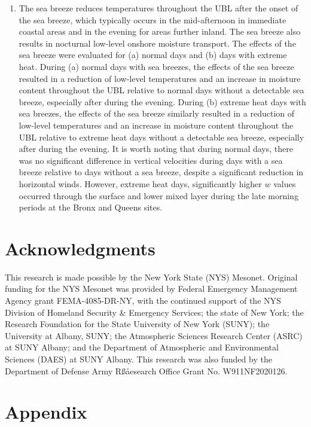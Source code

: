 \documentclass[11pt,a4paper]{article}
\begin{document}
\begin{enumerate}
	\item The sea breeze reduces temperatures throughout the UBL after the onset of the sea breeze, which typically occurs in the mid-afternoon in immediate coastal areas and in the evening for areas further inland. The sea breeze also results in nocturnal low-level onshore moisture transport. The effects of the sea breeze were evaluated for (a) normal days and (b) days with extreme heat. During (a) normal days with sea breezes, the effects of the sea breeze resulted in a reduction of low-level temperatures and an increase in moisture content throughout the UBL relative to normal days without a detectable sea breeze, especially after during the evening. During (b) extreme heat days with sea breezes, the effects of the sea breeze similarly resulted in a reduction of low-level temperatures and an increase in moisture content throughout the UBL relative to extreme heat days without a detectable sea breeze, especially after during the evening. It is worth noting that during normal days, there was no significant difference in vertical velocities during days with a sea breeze relative to days without a sea breeze, despite a significant reduction in horizontal winds. However, extreme heat days, significantly higher $w$ values occurred through the surface and lower mixed layer during the late morning periods at the Bronx and Queens sites.
	
\end{enumerate}

\section*{Acknowledgments}
This research is made possible by the New York State (NYS) Mesonet. Original funding for the NYS Mesonet was provided by Federal Emergency Management Agency grant FEMA-4085-DR-NY, with the continued support of the NYS Division of Homeland Security \& Emergency Services; the state of New York; the Research Foundation for the State University of New York (SUNY); the University at Albany, SUNY; the Atmospheric Sciences Research Center (ASRC) at SUNY Albany; and the Department of Atmospheric and Environmental Sciences (DAES) at SUNY Albany. This research was also funded by the Department of Defense Army Rßåesearch Office Grant No. W911NF2020126. 

\printbibliography

\section*{Appendix} \label{section:appendix}
\end{document}
